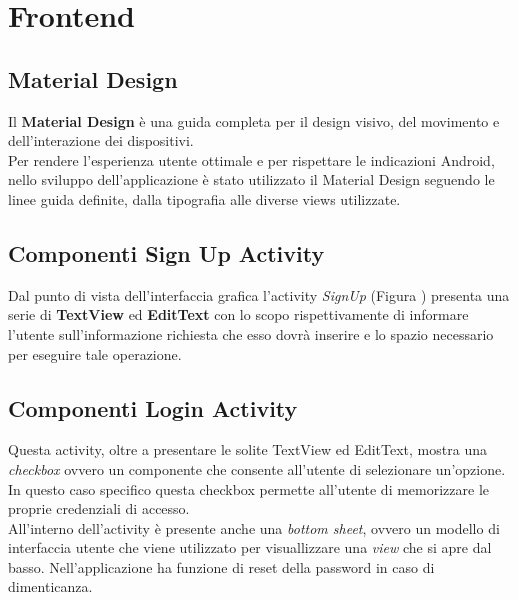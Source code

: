 \documentclass[a4paper,11pt,twoside,openright]{report}
\begin{document}
\section{Frontend}
\subsection{Material Design}
Il \textbf{Material Design} \cite{10} è una guida completa per il design visivo, del movimento e dell'interazione dei dispositivi.\\
Per rendere l'esperienza utente ottimale e per rispettare le indicazioni Android, nello sviluppo dell'applicazione è stato utilizzato il Material Design seguendo le linee guida definite, dalla tipografia alle diverse views utilizzate.

\subsection{Componenti Sign Up Activity}
Dal punto di vista dell'interfaccia grafica l'activity \textit{SignUp} (Figura ) presenta una serie di \textbf{TextView} ed \textbf{EditText} con lo scopo rispettivamente di informare l'utente sull'informazione richiesta che esso dovrà inserire e lo spazio necessario per eseguire tale operazione.

\subsection{Componenti Login Activity}
Questa activity, oltre a presentare le solite TextView ed EditText, mostra una \textit{checkbox} ovvero un componente che consente all'utente di selezionare un'opzione. In questo caso specifico  questa checkbox permette all'utente di memorizzare le proprie credenziali di accesso.\\
All'interno dell'activity è presente anche una \textit{bottom sheet}, ovvero un modello di interfaccia utente che viene utilizzato per visuallizzare una \textit{view} che si apre dal basso. Nell'applicazione ha funzione di reset della password in caso di dimenticanza.
\end{document}
